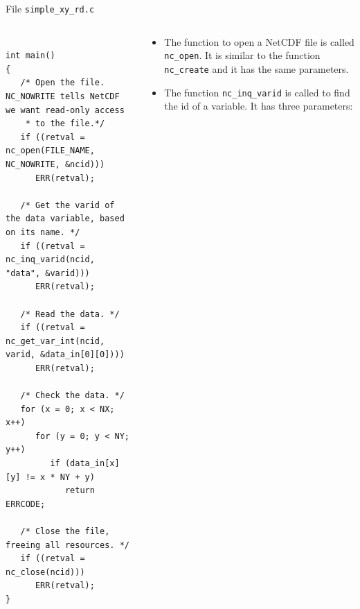 \documentclass[compress,11pt,xcolor=svgnames,aspectratio=169]{beamer}
\begin{document}
\begin{frame}[fragile]{File \texttt{simple\_xy\_rd.c}}

\begin{columns}

\begin{column}{0.5\textwidth}

{\tiny

\begin{verbatim}

int main()
{
   /* Open the file. NC_NOWRITE tells NetCDF we want read-only access
    * to the file.*/
   if ((retval = nc_open(FILE_NAME, NC_NOWRITE, &ncid)))
      ERR(retval);

   /* Get the varid of the data variable, based on its name. */
   if ((retval = nc_inq_varid(ncid, "data", &varid)))
      ERR(retval);

   /* Read the data. */
   if ((retval = nc_get_var_int(ncid, varid, &data_in[0][0])))
      ERR(retval);

   /* Check the data. */
   for (x = 0; x < NX; x++)
      for (y = 0; y < NY; y++)
         if (data_in[x][y] != x * NY + y)
            return ERRCODE;

   /* Close the file, freeing all resources. */
   if ((retval = nc_close(ncid)))
      ERR(retval);
}

\end{verbatim}

}

\end{column}

\begin{column}{0.5\textwidth}

{\footnotesize

\begin{itemize}
\setlength\itemsep{0.3cm}

\item The function to open a NetCDF file is called \verb|nc_open|. It is similar to the function \verb|nc_create| and it has the same parameters.

\item The function \verb|nc_inq_varid| is called to find the id of a variable. It has three parameters:



\end{itemize}}
\end{column}
\end{columns}
\end{frame}
\end{document}
